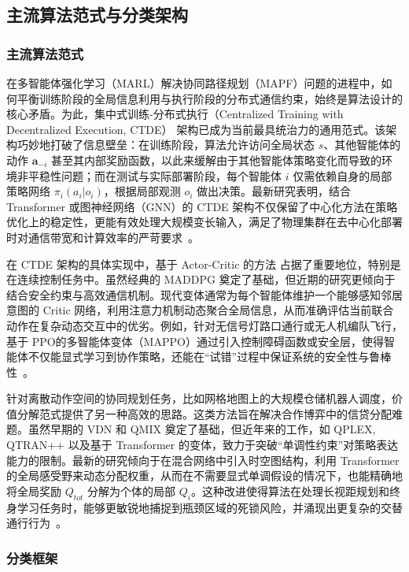 \documentclass[13.5pt]{extarticle}
\begin{document}
\subsection{主流算法范式与分类架构}

\subsubsection{主流算法范式}

在多智能体强化学习（MARL）解决协同路径规划（MAPF）问题的进程中，如何平衡训练阶段的全局信息利用与执行阶段的分布式通信约束，始终是算法设计的核心矛盾。为此，集中式训练-分布式执行（Centralized Training with Decentralized Execution, CTDE） 架构已成为当前最具统治力的通用范式。该架构巧妙地打破了信息壁垒：在训练阶段，算法允许访问全局状态 $s$、其他智能体的动作 $\boldsymbol{a}_{-i}$ 甚至其内部奖励函数，以此来缓解由于其他智能体策略变化而导致的环境非平稳性问题；而在测试与实际部署阶段，每个智能体 $i$ 仅需依赖自身的局部策略网络 $\pi_i(a_i|o_i)$，根据局部观测 $o_i$ 做出决策。最新研究表明，结合 Transformer 或图神经网络（GNN）的 CTDE 架构不仅保留了中心化方法在策略优化上的稳定性，更能有效处理大规模变长输入，满足了物理集群在去中心化部署时对通信带宽和计算效率的严苛要求~\cite{skrynnik2024learning, wang2023scrimp}。

在 CTDE 架构的具体实现中，基于 Actor-Critic 的方法 占据了重要地位，特别是在连续控制任务中。虽然经典的 MADDPG 奠定了基础，但近期的研究更倾向于结合安全约束与高效通信机制。现代变体通常为每个智能体维护一个能够感知邻居意图的 Critic 网络，利用注意力机制动态聚合全局信息，从而准确评估当前联合动作在复杂动态交互中的优劣。例如，针对无信号灯路口通行或无人机编队飞行，基于 PPO的多智能体变体（MAPPO）通过引入控制障碍函数或安全层，使得智能体不仅能显式学习到协作策略，还能在“试错”过程中保证系统的安全性与鲁棒性~\cite{yu2023surprising, gu2023safe}。

针对离散动作空间的协同规划任务，比如网格地图上的大规模仓储机器人调度，价值分解范式提供了另一种高效的思路。这类方法旨在解决合作博弈中的信贷分配难题。虽然早期的 VDN 和 QMIX 奠定了基础，但近年来的工作，如 QPLEX, QTRAN++ 以及基于 Transformer 的变体，致力于突破“单调性约束”对策略表达能力的限制。最新的研究倾向于在混合网络中引入时空图结构，利用 Transformer 的全局感受野来动态分配权重，从而在不需要显式单调假设的情况下，也能精确地将全局奖励 $Q_{tot}$ 分解为个体的局部 $Q_i$。这种改进使得算法在处理长视距规划和终身学习任务时，能够更敏锐地捕捉到瓶颈区域的死锁风险，并涌现出更复杂的交替通行行为~\cite{shao2024transformer, li2024scaling}。

\subsubsection{分类框架}
\end{document}
